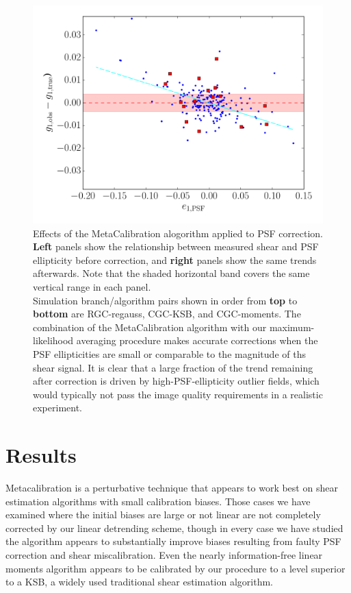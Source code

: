 \documentclass[iop]{emulateapj}
\begin{document}
\begin{figure}
\begin{center}
\includegraphics[width=0.4\linewidth]{./Plots/psf_e1-moments-opt-shear_plots.pdf}
\end{center}
\caption{Effects of the MetaCalibration alogorithm applied to PSF
  correction. {\bf Left} panels show the relationship between measured
  shear and PSF ellipticity before correction, and {\bf right} panels
  show the same trends afterwards. Note that the shaded horizontal
  band covers the same vertical range in each panel.  \\
  Simulation branch/algorithm pairs shown in order from {\bf top} to
  {\bf bottom} are RGC-regauss, CGC-KSB, and CGC-moments. The
  combination of the MetaCalibration algorithm with our
  maximum-likelihood averaging procedure makes accurate corrections
  when the PSF ellipticities are small or comparable to the magnitude
  of ths shear signal. It is clear that a large fraction of the trend
  remaining after correction is driven by high-PSF-ellipticity outlier
  fields, which would typically not pass the image quality
  requirements in a realistic experiment.}
\end{figure}


\section{Results}
Metacalibration is a perturbative technique that appears to work best
on shear estimation algorithms with small calibration biases. Those
cases we have examined where the initial biases are large or not
linear are not completely corrected by our linear detrending scheme,
though in every case we have studied the algorithm appears to
substantially improve biases resulting from faulty PSF correction and
shear miscalibration. Even the nearly information-free linear moments
algorithm appears to be calibrated by our procedure to a level
superior to a KSB, a widely used traditional shear estimation algorithm.
\end{document}
